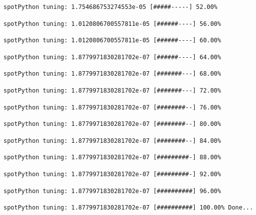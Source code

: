 \documentclass[
  letterpaper,
  DIV=11,
  numbers=noendperiod]{scrreprt}
\begin{document}
\begin{verbatim}
spotPython tuning: 1.754686753274553e-05 [#####-----] 52.00% 
\end{verbatim}

\begin{verbatim}
spotPython tuning: 1.0120806700557811e-05 [######----] 56.00% 
\end{verbatim}

\begin{verbatim}
spotPython tuning: 1.0120806700557811e-05 [######----] 60.00% 
\end{verbatim}

\begin{verbatim}
spotPython tuning: 1.8779971830281702e-07 [######----] 64.00% 
\end{verbatim}

\begin{verbatim}
spotPython tuning: 1.8779971830281702e-07 [#######---] 68.00% 
\end{verbatim}

\begin{verbatim}
spotPython tuning: 1.8779971830281702e-07 [#######---] 72.00% 
\end{verbatim}

\begin{verbatim}
spotPython tuning: 1.8779971830281702e-07 [########--] 76.00% 
\end{verbatim}

\begin{verbatim}
spotPython tuning: 1.8779971830281702e-07 [########--] 80.00% 
\end{verbatim}

\begin{verbatim}
spotPython tuning: 1.8779971830281702e-07 [########--] 84.00% 
\end{verbatim}

\begin{verbatim}
spotPython tuning: 1.8779971830281702e-07 [#########-] 88.00% 
\end{verbatim}

\begin{verbatim}
spotPython tuning: 1.8779971830281702e-07 [#########-] 92.00% 
\end{verbatim}

\begin{verbatim}
spotPython tuning: 1.8779971830281702e-07 [##########] 96.00% 
\end{verbatim}

\begin{verbatim}
spotPython tuning: 1.8779971830281702e-07 [##########] 100.00% Done...
\end{verbatim}
\end{document}
